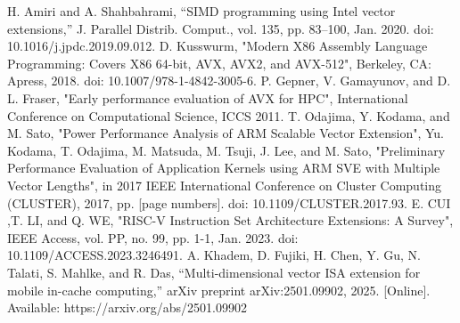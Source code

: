 \documentclass[conference]{IEEEtran}
\begin{document}








\begin{thebibliography}{00}
 H. Amiri and A. Shahbahrami, “SIMD programming using Intel vector extensions,” J. Parallel Distrib. Comput., vol. 135, pp. 83–100, Jan. 2020. doi: 10.1016/j.jpdc.2019.09.012.
 D. Kusswurm, "Modern X86 Assembly Language Programming: Covers X86 64-bit, AVX, AVX2, and AVX-512", Berkeley, CA: Apress, 2018. doi: 10.1007/978-1-4842-3005-6.
 P. Gepner, V. Gamayunov, and D. L. Fraser, "Early performance evaluation of AVX for HPC", International Conference on Computational Science, ICCS 2011.
 T. Odajima, Y. Kodama, and M. Sato, "Power Performance Analysis of ARM Scalable Vector Extension", 
 Yu. Kodama, T. Odajima, M. Matsuda, M. Tsuji, J. Lee, and M. Sato, "Preliminary Performance Evaluation of Application Kernels using ARM SVE with Multiple Vector Lengths", in 2017 IEEE International Conference on Cluster Computing (CLUSTER), 2017, pp. [page numbers]. doi: 10.1109/CLUSTER.2017.93.
 E. CUI ,T. LI, and Q. WE, "RISC-V Instruction Set Architecture Extensions: A Survey",  IEEE Access, vol. PP, no. 99, pp. 1-1, Jan. 2023. doi: 10.1109/ACCESS.2023.3246491.
 A. Khadem, D. Fujiki, H. Chen, Y. Gu, N. Talati, S. Mahlke, and R. Das, “Multi-dimensional vector ISA extension for mobile in-cache computing,” arXiv preprint arXiv:2501.09902, 2025. [Online]. Available: https://arxiv.org/abs/2501.09902

\end{thebibliography}
\end{document}
